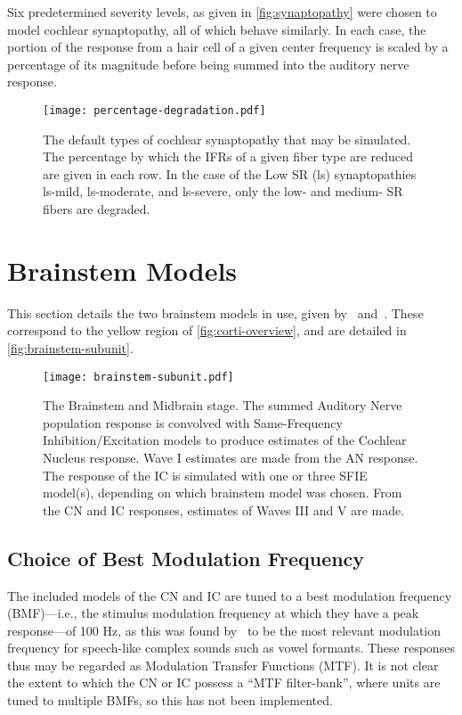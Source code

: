 Six predetermined severity levels, as given in \autoref{fig:synaptopathy} were chosen to model cochlear synaptopathy, all of which behave similarly.  In each case, the portion of the response from a hair cell of a given center frequency is scaled by a percentage of its magnitude before being summed into the auditory nerve response.  

\begin{figure}[htbp]
	\centering
	\texttt{[image: percentage-degradation.pdf]}
	\caption[Cochlear Synaptopathy Parameters]{The default types of cochlear synaptopathy that may be simulated. The percentage by which the IFRs of a given fiber type are reduced are given in each row.  In the case of the Low SR (ls) synaptopathies ls-mild, ls-moderate, and ls-severe, only the low- and medium- SR fibers are degraded.}
	\label{fig:synaptopathy}
\end{figure}

\section{Brainstem Models} %
\label{sec:brainstem_models}
This section details the two brainstem models in use, given by~\cite{Nelson2004Phenomenological} and~\cite{Carney2015Speech}.  These correspond to the yellow region of \autoref{fig:corti-overview}, and are detailed in \autoref{fig:brainstem-subunit}.

\begin{figure}[htbp]
	\centering
	\texttt{[image: brainstem-subunit.pdf]}
	\caption[The Brainstem and Midbrain Stage]{The Brainstem and Midbrain stage.  The summed Auditory Nerve population response is convolved with Same-Frequency Inhibition/Excitation models to produce estimates of the Cochlear Nucleus response.  Wave I estimates are made from the AN response.  The response of the IC is simulated with one or three SFIE model(s), depending on which brainstem model was chosen.  From the CN and IC responses, estimates of Waves III and V are made.}
	\label{fig:brainstem-subunit}
\end{figure}

\subsection{Choice of Best Modulation Frequency}
The included models of the CN and IC are tuned to a best modulation frequency (BMF)---i.e., the stimulus modulation frequency at which they have a peak response---of 100 Hz, as this was found by~\cite{Carney2015Speech} to be the most relevant modulation frequency for speech-like complex sounds such as vowel formants. These responses thus may be regarded as Modulation Transfer Functions (MTF).  It is not clear the extent to which the CN or IC possess a ``MTF filter-bank'', where units are tuned to multiple BMFs, so this has not been implemented.

